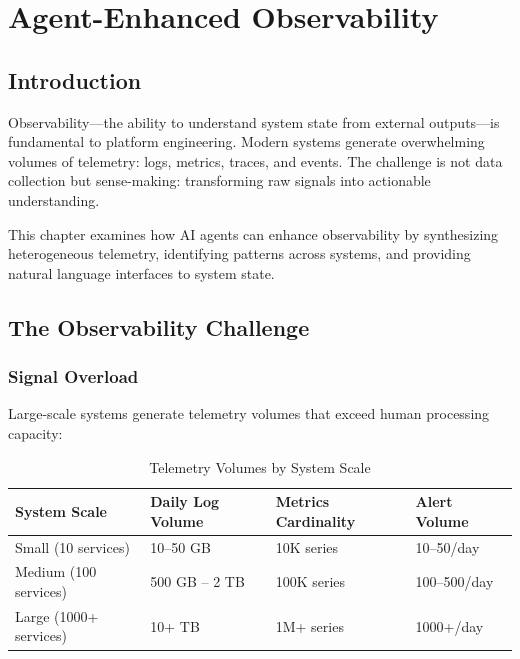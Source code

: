 \chapter{Agent-Enhanced Observability}
\label{ch:observability}


\section{Introduction}
\label{sec:observability-intro}

Observability---the ability to understand system state from external outputs---is fundamental to platform engineering. Modern systems generate overwhelming volumes of telemetry: logs, metrics, traces, and events. The challenge is not data collection but sense-making: transforming raw signals into actionable understanding.

This chapter examines how AI agents can enhance observability by synthesizing heterogeneous telemetry, identifying patterns across systems, and providing natural language interfaces to system state.

\section{The Observability Challenge}
\label{sec:observability-challenge}

\subsection{Signal Overload}
\label{subsec:signal-overload}

Large-scale systems generate telemetry volumes that exceed human processing capacity:

\begin{table}[htbp]
\centering
\caption{Telemetry Volumes by System Scale}
\label{tab:telemetry-volumes}
\begin{tabular}{llll}
\toprule
\textbf{System Scale} & \textbf{Daily Log Volume} & \textbf{Metrics Cardinality} & \textbf{Alert Volume} \\
\midrule
Small (10 services) & 10--50 GB & 10K series & 10--50/day \\
Medium (100 services) & 500 GB -- 2 TB & 100K series & 100--500/day \\
Large (1000+ services) & 10+ TB & 1M+ series & 1000+/day \\
\bottomrule
\end{tabular}
\end{table}

